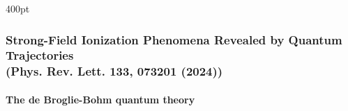 \begin{frame}
\begin{textblock*}{400pt}
\begin{itemize}
\end{itemize}
\end{textblock*}



\end{frame}



\begin{frame}
\frametitle{Strong-Field Ionization Phenomena Revealed by Quantum Trajectories \\
\small (Phys. Rev. Lett. \textbf{133}, 073201 (2024))}
\framesubtitle{The de Broglie-Bohm quantum theory}


\footnotesize
 

\end{frame}
